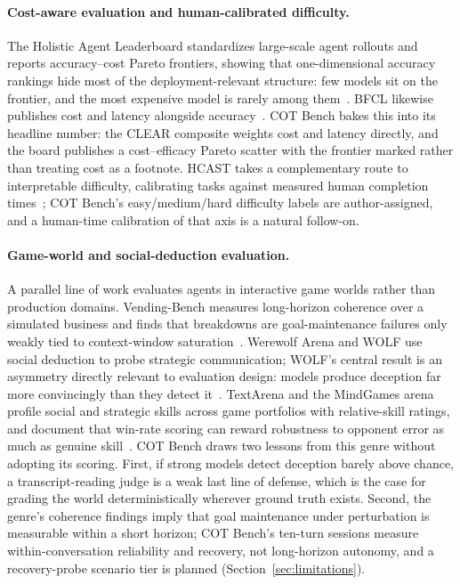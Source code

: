 \paragraph{Cost-aware evaluation and human-calibrated difficulty.} The Holistic
Agent Leaderboard standardizes large-scale agent rollouts and reports
accuracy--cost Pareto frontiers, showing that one-dimensional accuracy rankings
hide most of the deployment-relevant structure: few models sit on the frontier,
and the most expensive model is rarely among them~\cite{hal2025}. BFCL likewise
publishes cost and latency alongside accuracy~\cite{bfcl2024}. COT Bench bakes
this into its headline number: the CLEAR composite weights cost and latency
directly, and the board publishes a cost--efficacy Pareto scatter with the
frontier marked rather than treating cost as a footnote. HCAST takes a complementary route to interpretable
difficulty, calibrating tasks against measured human completion
times~\cite{hcast2025}; COT Bench's easy/medium/hard difficulty labels are
author-assigned, and a human-time calibration of that axis is a natural follow-on.

\paragraph{Game-world and social-deduction evaluation.} A parallel line of work
evaluates agents in interactive game worlds rather than production domains.
Vending-Bench measures long-horizon coherence over a simulated business and finds
that breakdowns are goal-maintenance failures only weakly tied to context-window
saturation~\cite{vendingbench2025}. Werewolf Arena and WOLF use social deduction
to probe strategic communication; WOLF's central result is an asymmetry directly
relevant to evaluation design: models produce deception far more convincingly than
they detect it~\cite{werewolfarena2024,wolf2025}. TextArena and the MindGames
arena profile social and strategic skills across game portfolios with
relative-skill ratings, and document that win-rate scoring can reward robustness
to opponent error as much as genuine skill~\cite{textarena2025,mindgames2026}.
COT Bench draws two lessons from this genre without adopting its scoring. First,
if strong models detect deception barely above chance, a transcript-reading judge
is a weak last line of defense, which is the case for grading the world
deterministically wherever ground truth exists. Second, the genre's coherence
findings imply that goal maintenance under perturbation is measurable within a
short horizon; COT Bench's ten-turn sessions measure within-conversation
reliability and recovery, not long-horizon autonomy, and a recovery-probe scenario
tier is planned (Section~\ref{sec:limitations}).

